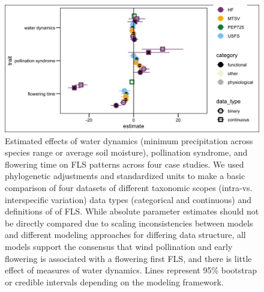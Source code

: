 \documentclass[12pt]{article}\usepackage[]{graphicx}\usepackage[]{color}
\begin{document}
        \begin{figure}[ht]
    \centering
    \includegraphics[width=\textwidth]{..//figure/allmods_effectsizes_combined.jpeg}
    \caption{Estimated effects of water dynamics (minimum precipitation across species range or average soil moisture), pollination syndrome, and flowering time on FLS patterns across four case studies. We used phylogenetic adjustments and standardized units to make a basic comparison of four datasets of different taxonomic scopes (intra-vs. interspecific variation) data types (categorical and continuous) and definitions of of FLS. While absolute parameter estimates should not be directly compared due to scaling inconsistencies between models and different modeling approaches for differing data structure, all models support the consensus that wind pollination and early flowering is associated with a flowering first FLS, and there is little effect of measures of water dynamics. Lines represent 95\% bootstrap or credible intervals depending on the modeling framework.}
    \label{fig:Figure 4}
    \end{figure}




\end{document}
